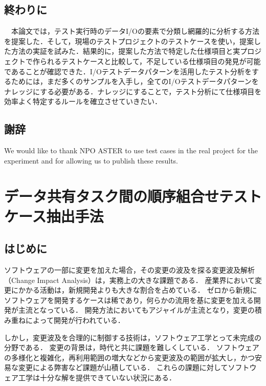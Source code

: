 \documentclass[a4paper,12pt]{jreport}
\begin{document}
\section{終わりに}
　本論文では，テスト実行時のデータI/Oの要素で分類し網羅的に分析する方法を提案した．そして，現場のテストプロジェクトのテストケースを使い，提案した方法の実証を試みた．結果的に，提案した方法で特定した仕様項目と実プロジェクトで作られるテストケースと比較して，不足している仕様項目の発見が可能であることが確認できた．I/Oテストデータパターンを活用したテスト分析をするためには，まだ多くのサンプルを入手し，全てのI/Oテストデータパターンをナレッジにする必要がある．ナレッジにすることで，テスト分析にて仕様項目を効率よく特定するルールを確立させていきたい．

\section{謝辞}
We would like to thank NPO ASTER to use test cases in the real project for the experiment and for allowing us to publish these results.



\chapter{データ共有タスク間の順序組合せテストケース抽出手法}

\section{はじめに}
ソフトウェアの一部に変更を加えた場合，その変更の波及を探る変更波及解析（Change Impact Analysis）は，実務上の大きな課題である．
産業界において変更にかかる活動は，新規開発よりも大きな割合を占めている．
ゼロから新規にソフトウェアを開発するケースは稀であり，何らかの流用を基に変更を加える開発が主流となっている．
開発方法においてもアジャイルが主流となり，変更の積み重ねによって開発が行われている．

しかし，変更波及を合理的に制御する技術は，ソフトウェア工学とって未完成の分野である\cite{arnold1996software}．
変更の背景は，時代と共に課題を難しくしている．
ソフトウェアの多様化と複雑化，再利用範囲の増大などから変更波及の範囲が拡大し，かつ安易な変更による弊害など課題が山積している．
これらの課題に対してソフトウェア工学は十分な解を提供できていない状況にある\cite{li2013survey}．
\end{document}
